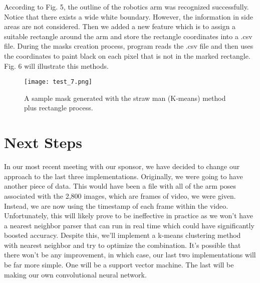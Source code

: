 \documentclass[10pt,journal,compsoc, draftclsnofoot,onecolumn]{IEEEtran}
\begin{document}
\noindent According to Fig. 5, the outline of the robotics arm was recognized successfully. Notice that there exists a wide white boundary. However, the information in side areas are not considered. Then we added a new feature which is to assign a suitable rectangle around the arm and store the rectangle coordinates into a .csv file. During the masks creation process, program reads the .csv file and then uses the coordinates to paint black on each pixel that is not in the marked rectangle. Fig. 6 will illustrate this methods. 

\begin{figure}[H]
  \begin{center}
    \texttt{[image: test\_7.png]}
  \end{center}
  \caption{A sample mask generated with the straw man (K-means) method plus rectangle process.}
\end{figure}


\section{Next Steps}
In our most recent meeting with our sponsor, we have decided to change our approach to the last three implementations.
Originally, we were going to have another piece of data.
This would have been a file with all of the arm poses associated with the 2,800 images, which are frames of video, we were given.
Instead, we are now using the timestamp of each frame within the video.
Unfortunately, this will likely prove to be ineffective in practice as we won't have a nearest neighbor parser that can run in real time which could have significantly boosted accuracy.
Despite this, we'll implement a k-means clustering method with nearest neighbor and try to optimize the combination.
It's possible that there won't be any improvement, in which case, our last two implementations will be far more simple.
One will be a support vector machine.
The last will be making our own convolutional neural network.
\end{document}
